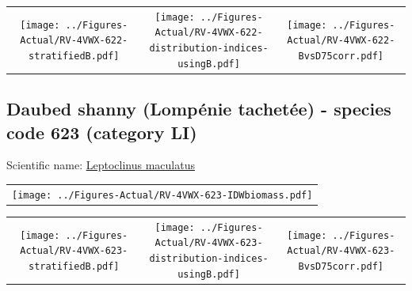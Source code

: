 \documentclass[12pt]{article}\usepackage[]{graphicx}\usepackage[]{color}
\begin{document}
\vspace{1cm}
\begin{minipage}{1.0\textwidth}
 \begin{tabular}{ccc}
\texttt{[image: ../Figures-Actual/RV-4VWX-622-stratifiedB.pdf]} & 
\texttt{[image: ../Figures-Actual/RV-4VWX-622-distribution-indices-usingB.pdf]} & 
\texttt{[image: ../Figures-Actual/RV-4VWX-622-BvsD75corr.pdf]} \\ 
\end{tabular} 
\end{minipage}
\clearpage

\renewcommand\thefigure{\thesubsection\Alph{figure}}

\setcounter{figure}{0}

\hypertarget{sec:623}{%
\subsection{Daubed shanny (Lompénie tachetée) - species code 623 (category LI)}\label{sec:623}}

  


Scientific name: \href{http://www.marinespecies.org/aphia.php?p=taxdetails\&id=127072}{Leptoclinus maculatus} \newline
\begin{minipage}{1.0\textwidth}
 \begin{tabular}{c}
\texttt{[image: ../Figures-Actual/RV-4VWX-623-IDWbiomass.pdf]} \\ 
\end{tabular} 
\end{minipage}
\newline

\vspace{1cm}
\begin{minipage}{1.0\textwidth}
 \begin{tabular}{ccc}
\texttt{[image: ../Figures-Actual/RV-4VWX-623-stratifiedB.pdf]} & 
\texttt{[image: ../Figures-Actual/RV-4VWX-623-distribution-indices-usingB.pdf]} & 
\texttt{[image: ../Figures-Actual/RV-4VWX-623-BvsD75corr.pdf]} \\ 
\end{tabular} 
\end{minipage}
\clearpage
\end{document}
